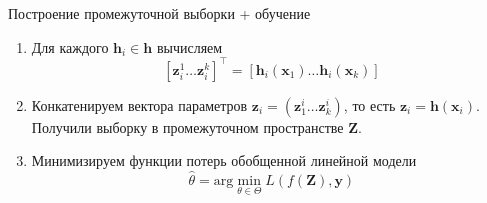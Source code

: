 \documentclass{beamer}
\newcommand{\bz}{\mathbf{z}}
\newcommand{\bx}{\mathbf{x}}
\newcommand{\by}{\mathbf{y}}
\newcommand{\bh}{\mathbf{h}}
\newcommand{\bZ}{\mathbf{Z}}
\begin{document}
\begin{frame}{Построение промежуточной выборки + обучение}
    \begin{enumerate}
        \item Для каждого $\bh_i \in \bh$ вычисляем
        $$
        [\bz_i^1 \ldots \bz_i^k]^\intercal = [\bh_i(\bx_1) \ldots \bh_i(\bx_k)]
        $$
        \item Конкатенируем вектора параметров $\bz_i = (\bz_1^i \ldots \bz_k^i)$,
        то есть $\bz_i = \bh(\bx_i)$. Получили выборку в промежуточном пространстве $\bZ$.
        \item Минимизируем функции потерь обобщенной линейной модели
        $$
        \hat{\theta} = \mathrm{arg}\min_{\theta \in \Theta} L(f(\bZ), \by)
        $$
    \end{enumerate}
\end{frame}

\end{document}
